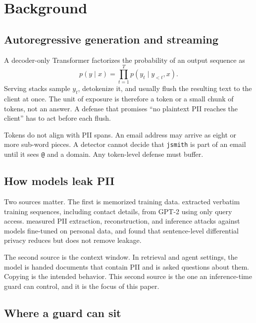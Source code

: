 \documentclass[11pt]{article}
\newcommand{\code}[1]{\texttt{#1}}
\begin{document}
\section{Background}
\label{sec:background}

\subsection{Autoregressive generation and streaming}

A decoder-only Transformer \citep{vaswani2017attention} factorizes the probability of an output sequence as
\begin{equation}
  p(y \mid x) = \prod_{t=1}^{T} p(y_t \mid y_{<t}, x).
  \label{eq:ar}
\end{equation}
Serving stacks sample $y_t$, detokenize it, and usually flush the resulting text to the client at once. The unit of exposure is therefore a token or a small chunk of tokens, not an answer. A defense that promises ``no plaintext PII reaches the client'' has to act before each flush.

Tokens do not align with PII spans. An email address may arrive as eight or more sub-word pieces. A detector cannot decide that \code{jsmith} is part of an email until it sees \code{@} and a domain. Any token-level defense must buffer.

\subsection{How models leak PII}

Two sources matter. The first is memorized training data. \citet{carlini2021extracting} extracted verbatim training sequences, including contact details, from GPT-2 using only query access. \citet{lukas2023analyzing} measured PII extraction, reconstruction, and inference attacks against models fine-tuned on personal data, and found that sentence-level differential privacy reduces but does not remove leakage.

The second source is the context window. In retrieval and agent settings, the model is handed documents that contain PII and is asked questions about them. Copying is the intended behavior. This second source is the one an inference-time guard can control, and it is the focus of this paper.

\subsection{Where a guard can sit}
\end{document}
